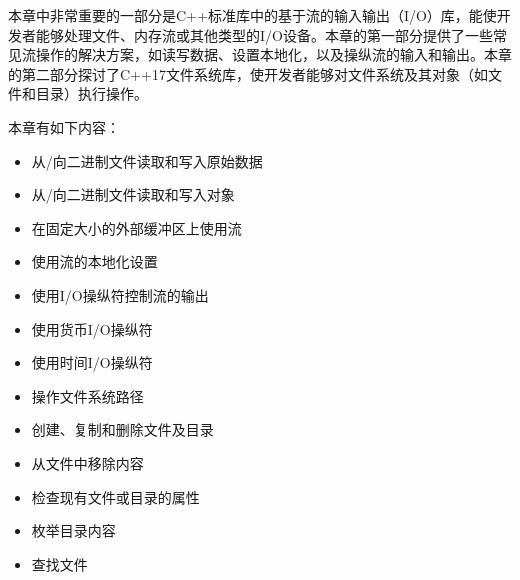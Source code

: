 本章中非常重要的一部分是C++标准库中的基于流的输入输出（I/O）库，能使开发者能够处理文件、内存流或其他类型的I/O设备。本章的第一部分提供了一些常见流操作的解决方案，如读写数据、设置本地化，以及操纵流的输入和输出。本章的第二部分探讨了C++17文件系统库，使开发者能够对文件系统及其对象（如文件和目录）执行操作。

本章有如下内容：

\begin{itemize}
\item
从/向二进制文件读取和写入原始数据

\item
从/向二进制文件读取和写入对象

\item
在固定大小的外部缓冲区上使用流

\item
使用流的本地化设置

\item
使用I/O操纵符控制流的输出

\item
使用货币I/O操纵符

\item
使用时间I/O操纵符

\item
操作文件系统路径

\item
创建、复制和删除文件及目录

\item
从文件中移除内容

\item
检查现有文件或目录的属性

\item
枚举目录内容

\item
查找文件
\end{itemize}
